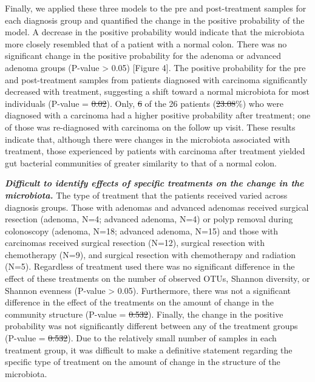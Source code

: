 \documentclass[12pt,]{article}
\providecommand{\DIFaddtex}[1]{{\protect\color{blue}\uwave{#1}}} %
\providecommand{\DIFdeltex}[1]{{\protect\color{red}\sout{#1}}}                      %
\providecommand{\DIFaddbegin}{} %
\providecommand{\DIFaddend}{} %
\providecommand{\DIFdelbegin}{} %
\providecommand{\DIFdelend}{} %
\providecommand{\DIFadd}[1]{\texorpdfstring{\DIFaddtex{#1}}{#1}} %
\providecommand{\DIFdel}[1]{\texorpdfstring{\DIFdeltex{#1}}{}} %
\begin{document}
Finally, we applied these three models to the pre and post-treatment
samples for each diagnosis group and quantified the change in the
positive probability of the model. A decrease in the positive
probability would indicate that the microbiota more closely resembled
that of a patient with a normal colon. There was no significant change
in the positive probability for the adenoma or advanced adenoma groups
(P-value \textgreater{} 0.05) {[}Figure 4{]}. The positive probability
for the pre and post-treatment samples from patients diagnosed with
carcinoma significantly decreased with treatment, suggesting a shift
toward a normal microbiota for most individuals (P-value = \DIFdelbegin \DIFdel{0.02}\DIFdelend \DIFaddbegin \DIFadd{0.001}\DIFaddend ). Only,
\DIFdelbegin \DIFdel{6 }\DIFdelend \DIFaddbegin \DIFadd{7 }\DIFaddend of the 26 patients (\DIFdelbegin \DIFdel{23.08}\DIFdelend \DIFaddbegin \DIFadd{26.92}\DIFaddend \%) who were diagnosed with a carcinoma had a
higher positive probability after treatment; one of those was
re-diagnosed with carcinoma on the follow up visit. These results
indicate that, although there were changes in the microbiota associated
with treatment, those experienced by patients with carcinoma after
treatment yielded gut bacterial communities of greater similarity to
that of a normal colon.

\textbf{\emph{Difficult to identify effects of specific treatments on
the change in the microbiota.}} The type of treatment that the patients
received varied across diagnosis groups. Those with adenomas and
advanced adenomas received surgical resection (adenoma, N=4; advanced
adenoma, N=4) or polyp removal during colonoscopy (adenoma, N=18;
advanced adenoma, N=15) and those with carcinomas received surgical
resection (N=12), surgical resection with chemotherapy (N=9), and
surgical resection with chemotherapy and radiation (N=5). Regardless of
treatment used there was no significant difference in the effect of
these treatments on the number of observed OTUs, Shannon diversity, or
Shannon evenness (P-value \textgreater{} 0.05). Furthermore, there was
not a significant difference in the effect of the treatments on the
amount of change in the community structure (P-value = \DIFdelbegin \DIFdel{0.532}\DIFdelend \DIFaddbegin \DIFadd{0.375}\DIFaddend ). Finally,
the change in the positive probability was not significantly different
between any of the treatment groups (P-value = \DIFdelbegin \DIFdel{0.532}\DIFdelend \DIFaddbegin \DIFadd{0.375}\DIFaddend ). Due to the
relatively small number of samples in each treatment group, it was
difficult to make a definitive statement regarding the specific type of
treatment on the amount of change in the structure of the microbiota.
\end{document}
